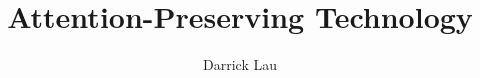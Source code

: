 \documentclass[a4paper,12pt,twoside]{report}
\begin{document}
\title{\LARGE {\bf Attention-Preserving Technology}\\
 \vspace*{6mm}
}

\author{Darrick Lau}

\normallinespacing
\maketitle
\preface




\body



% 
% 




\appendix



\end{document}
